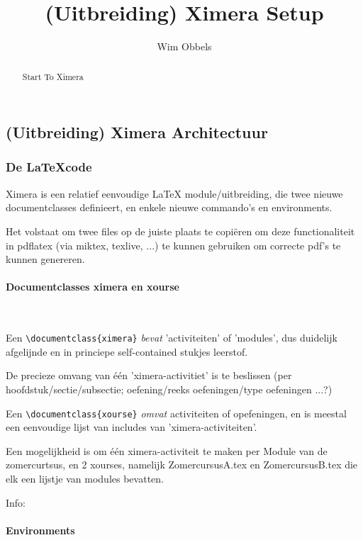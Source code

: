 \documentclass{ximera}
\author{Wim Obbels}
\title{(Uitbreiding) Ximera Setup}
\begin{document}
\begin{abstract}
	Start To Ximera
\end{abstract}
\maketitle


\subsection{(Uitbreiding) Ximera Architectuur}

\subsubsection{De \LaTeX code}

Ximera is een relatief eenvoudige LaTeX module/uitbreiding, die twee nieuwe documentclasses definieert, en enkele nieuwe commando's en environments.

Het volstaat om twee files op de juiste plaats te copiëren om deze functionaliteit in pdflatex (via miktex, texlive, ...)  te kunnen gebruiken om correcte pdf's te kunnen genereren.


\paragraph{Documentclasses ximera en xourse} \ 

Een \verb|\documentclass{ximera}| \textit{bevat} 'activiteiten' of 'modules', dus duidelijk afgelijnde en in princiepe self-contained stukjes leerstof. 

De precieze omvang van één 'ximera-activitiet' is te beslissen (per hoofdstuk/sectie/subsectie; oefening/reeks oefeningen/type oefeningen ...?)

Een \verb|\documentclass{xourse}| \textit{omvat}  activiteiten of opefeningen, en is meestal een eenvoudige lijst van includes van 'ximera-activiteiten'. 

Een mogelijkheid is om één ximera-activiteit te maken per Module van de zomercurtsus, en 2 xourses, namelijk ZomercursusA.tex en ZomercursusB.tex die elk een lijstje van modules bevatten.


Info: 

\paragraph{Environments} \ 
\end{document}
